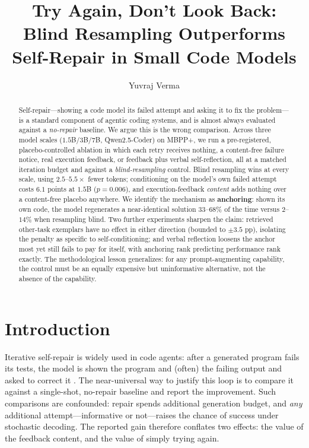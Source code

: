 \documentclass{article}
\title{Try Again, Don't Look Back:\\
Blind Resampling Outperforms Self-Repair in Small Code Models}
\author{Yuvraj Verma}
\date{}
\begin{document}
\maketitle

\begin{abstract}
Self-repair---showing a code model its failed attempt and asking it to fix the
problem---is a standard component of agentic coding systems, and is almost
always evaluated against a \emph{no-repair} baseline. We argue this is the
wrong comparison. Across three model scales
($1.5$B/$3$B/$7$B, Qwen2.5-Coder) on MBPP+, we run a pre-registered,
placebo-controlled ablation in which each retry receives nothing, a
content-free failure notice, real execution feedback, or feedback plus verbal
self-reflection, all at a matched iteration budget and against a
\emph{blind-resampling} control. Blind resampling wins at every scale, using
$2.5$--$5.5\times$ fewer tokens; conditioning on the model's own failed
attempt costs $6.1$ points at $1.5$B ($p{=}0.006$), and execution-feedback
\emph{content} adds nothing over a content-free placebo anywhere. We identify
the mechanism as \textbf{anchoring}: shown its own code, the model regenerates
a near-identical solution $33$--$68\%$ of the time versus $2$--$14\%$ when
resampling blind. Two further experiments sharpen the claim: retrieved
other-task exemplars have no effect in either direction (bounded to
$\pm3.5$ pp), isolating the penalty as specific to self-conditioning; and
verbal reflection loosens the anchor most yet still fails to pay for itself,
with anchoring rank predicting performance rank exactly. The methodological
lesson generalizes: for any prompt-augmenting capability, the control must be
an equally expensive but uninformative alternative, not the absence of the
capability.
\end{abstract}

\section{Introduction}
\label{sec:intro}

Iterative self-repair is widely used in code agents: after a generated program
fails its tests, the model is shown the program and (often) the failing output
and asked to correct it \citep{shinn2023reflexion,madaan2023selfrefine,
olausson2023selfrepair}. The near-universal way to justify this loop is to
compare it against a single-shot, no-repair baseline and report the
improvement. Such comparisons are confounded: repair spends additional
generation budget, and \emph{any} additional attempt---informative or
not---raises the chance of success under stochastic decoding. The reported
gain therefore conflates two effects: the value of the feedback content, and
the value of simply trying again.
\end{document}
